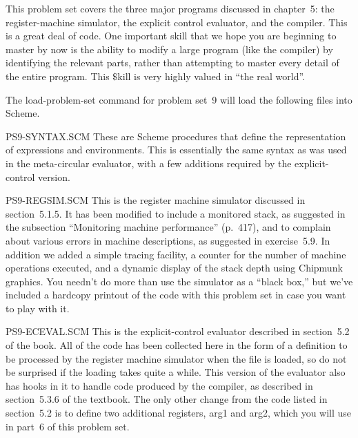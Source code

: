 This problem set covers the three major programs discussed in chapter~5: the
register-machine simulator, the explicit control evaluator, and
the compiler.  This is a great deal of code.  One important skill that
we hope you are beginning to master by now is the ability to modify a
large program (like the compiler) by identifying the relevant parts,
rather than attempting to master every detail of the entire program.
This $\$$kill is very highly valued in ``the real world''.

\bigskip


\newpage

The {\cf load-problem-set} command for problem set~9 will load the
following files into {\sc Scheme}.

{\cf PS9-SYNTAX.SCM }
These are {\sc Scheme} procedures that define the representation of
expressions and environments.  This is essentially the same syntax as
was used in the meta-circular evaluator, with a few additions required
by the explicit-control version.

{\cf PS9-REGSIM.SCM}
This is the register machine simulator discussed in section~5.1.5.  It
has been modified to include a monitored stack, as suggested in the
subsection ``Monitoring machine performance'' (p.~417), and to
complain about various errors in machine descriptions, as suggested in
exercise~5.9. In addition we added a simple tracing facility, a
counter for the number of machine operations executed, and a dynamic
display of the stack depth using Chipmunk graphics.  You needn't do
more than use the simulator as a ``black box,'' but we've included a
hardcopy printout of the code with this problem set in case you want
to play with it.

{\cf PS9-ECEVAL.SCM }
This is the explicit-control evaluator described in section~5.2 of the
book. All of the code has been collected here in the form of a
definition to be processed by the register machine simulator when the
file is loaded, so do not be surprised if the loading takes quite a
while. This version of the evaluator also has hooks in it to handle
code produced by the compiler, as described in section~5.3.6 of the
textbook.  The only other change from the code listed in section~5.2
is to define two additional registers, {\cf arg1} and {\cf arg2},
which you will use in part~6 of this problem set.

